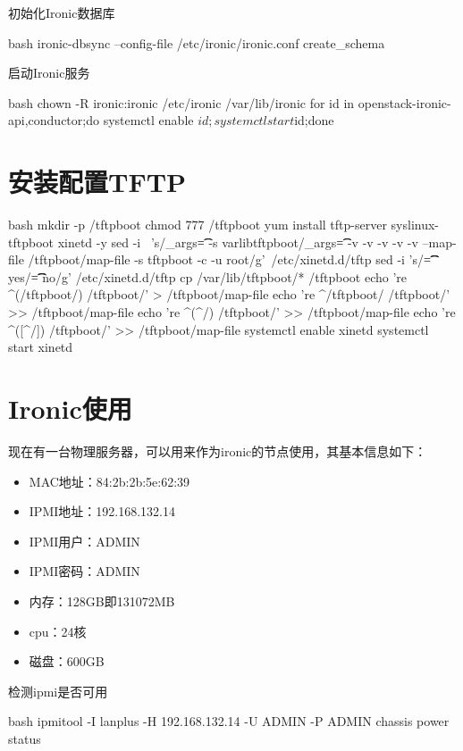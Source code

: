 初始化Ironic数据库
\begin{code-block}{bash}
ironic-dbsync --config-file /etc/ironic/ironic.conf create_schema
\end{code-block}

启动Ironic服务
\begin{code-block}{bash}
chown -R ironic:ironic /etc/ironic /var/lib/ironic
for id in openstack-ironic-{api,conductor};do systemctl enable $id;systemctl start $id;done
\end{code-block}

\section{安装配置TFTP}
\begin{code-block}{bash}
mkdir -p /tftpboot
chmod 777 /tftpboot
yum install tftp-server syslinux-tftpboot xinetd -y
sed -i \
    's/\tserver_args\t\t= -s \/var\/lib\/tftpboot/\tserver_args\t\t= -v -v -v -v -v --map-file /tftpboot/map-file -s \/tftpboot -c -u root/g'\
    /etc/xinetd.d/tftp
sed -i 's/\tdisable\t\t\t= yes/\tdisable\t\t\t= no/g' /etc/xinetd.d/tftp
cp /var/lib/tftpboot/* /tftpboot
echo 're ^(/tftpboot/) /tftpboot/\2' > /tftpboot/map-file
echo 're ^/tftpboot/ /tftpboot/' >> /tftpboot/map-file
echo 're ^(^/) /tftpboot/\1' >> /tftpboot/map-file
echo 're ^([^/]) /tftpboot/\1' >> /tftpboot/map-file
systemctl enable xinetd
systemctl start xinetd
\end{code-block}

\section{Ironic使用}
现在有一台物理服务器，可以用来作为ironic的节点使用，其基本信息如下：
\begin{itemize}
  \item MAC地址：84:2b:2b:5e:62:39
  \item IPMI地址：192.168.132.14
  \item IPMI用户：ADMIN
  \item IPMI密码：ADMIN
  \item 内存：128GB即131072MB
  \item cpu：24核
  \item 磁盘：600GB
\end{itemize}

检测ipmi是否可用
\begin{code-block}{bash}
ipmitool -I lanplus -H 192.168.132.14  -U ADMIN -P ADMIN chassis power status
\end{code-block}

